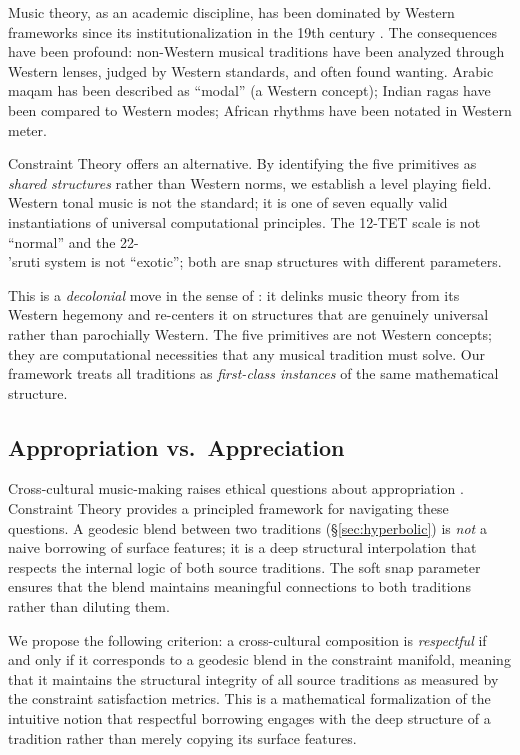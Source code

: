 \documentclass[cmj]{article}
\begin{document}
Music theory, as an academic discipline, has been dominated by Western
frameworks since its institutionalization in the 19th century
\citep{baker2014defining}. The consequences have been profound: non-Western
musical traditions have been analyzed through Western lenses, judged by Western
standards, and often found wanting. Arabic maqam has been described as
``modal'' (a Western concept); Indian ragas have been compared to Western
modes; African rhythms have been notated in Western meter.

Constraint Theory offers an alternative. By identifying the five primitives as
\emph{shared structures} rather than Western norms, we establish a level
playing field. Western tonal music is not the standard; it is one of seven
equally valid instantiations of universal computational principles. The
12-TET scale is not ``normal'' and the 22-\\'{s}ruti system is not ``exotic'';
both are snap structures with different parameters.

This is a \emph{decolonial} move in the sense of \citet{mignolo2011darker}:
it delinks music theory from its Western hegemony and re-centers it on
structures that are genuinely universal rather than parochially Western. The
five primitives are not Western concepts; they are computational necessities
that any musical tradition must solve. Our framework treats all traditions as
\emph{first-class instances} of the same mathematical structure.

\subsection{Appropriation vs.\ Appreciation}

Cross-cultural music-making raises ethical questions about appropriation
\citep{young2008cultural}. Constraint Theory provides a principled framework
for navigating these questions. A geodesic blend between two traditions
(\S\ref{sec:hyperbolic}) is \emph{not} a naive borrowing of surface features;
it is a deep structural interpolation that respects the internal logic of both
source traditions. The soft snap parameter ensures that the blend maintains
meaningful connections to both traditions rather than diluting them.

We propose the following criterion: a cross-cultural composition is
\emph{respectful} if and only if it corresponds to a geodesic blend in the
constraint manifold, meaning that it maintains the structural integrity of all
source traditions as measured by the constraint satisfaction metrics. This is
a mathematical formalization of the intuitive notion that respectful borrowing
engages with the deep structure of a tradition rather than merely copying its
surface features.
\end{document}
